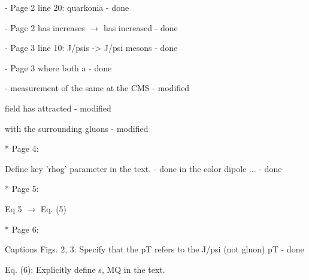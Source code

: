\documentclass[a4paper,11pt]{article}
\begin{document}
- Page 2 line 20: quarkonia \newline
- {\color{blue} done} \newline

- Page 2 has increases $\rightarrow$ has increased
- {\color{blue} done} \newline

- Page 3 line 10: J/psis -> J/psi mesons \newline
- {\color{blue} done} \newline

- Page 3 where both a \newline
- {\color{blue} done} \newline

- measurement of the same at the CMS \newline
- {\color{blue} modified} \newline

field has attracted 
- {\color{blue} modified} \newline

 with the surrounding gluons 
 - {\color{blue} modified} \newline
 
* Page 4: \newline

 Define key 'rhog' parameter in the text. \newline 
- {\color{blue} done} \newline
 in the color dipole ... \newline
- {\color{blue} done}\newline

* Page 5: \newline

 Eq 5 $\rightarrow$ Eq. (5) \newline

* Page 6: \newline

Captions Figs. 2, 3: Specify that the pT refers to the J/psi (not gluon) pT 
- {\color{blue} done}\newline

Eq. (6): Explicitly define s, MQ in the text. \newline

\end{document}
